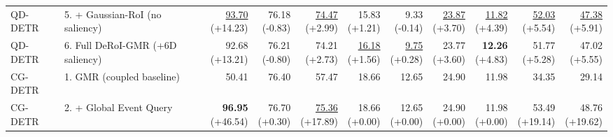 \documentclass{article}
\begin{document}
{\begin{tabular}{llrrrrrrrrr}
QD-DETR & 5. + Gaussian-RoI (no saliency) & \shortstack{\underline{93.70} \\ {\scriptsize (+14.23)}} & \shortstack{76.18 \\ {\scriptsize (-0.83)}} & \shortstack{\underline{74.47} \\ {\scriptsize (+2.99)}} & \shortstack{15.83 \\ {\scriptsize (+1.21)}} & \shortstack{9.33 \\ {\scriptsize (-0.14)}} & \shortstack{\underline{23.87} \\ {\scriptsize (+3.70)}} & \shortstack{\underline{11.82} \\ {\scriptsize (+4.39)}} & \shortstack{\underline{52.03} \\ {\scriptsize (+5.54)}} & \shortstack{\underline{47.38} \\ {\scriptsize (+5.91)}} \\
QD-DETR & 6. Full DeRoI-GMR (+6D saliency) & \shortstack{92.68 \\ {\scriptsize (+13.21)}} & \shortstack{76.21 \\ {\scriptsize (-0.80)}} & \shortstack{74.21 \\ {\scriptsize (+2.73)}} & \shortstack{\underline{16.18} \\ {\scriptsize (+1.56)}} & \shortstack{\underline{9.75} \\ {\scriptsize (+0.28)}} & \shortstack{23.77 \\ {\scriptsize (+3.60)}} & \shortstack{\textbf{12.26} \\ {\scriptsize (+4.83)}} & \shortstack{51.77 \\ {\scriptsize (+5.28)}} & \shortstack{47.02 \\ {\scriptsize (+5.55)}} \\
\midrule
CG-DETR & 1. GMR (coupled baseline) & 50.41 & 76.40 & 57.47 & 18.66 & 12.65 & 24.90 & 11.98 & 34.35 & 29.14 \\
CG-DETR & 2. + Global Event Query & \shortstack{\textbf{96.95} \\ {\scriptsize (+46.54)}} & \shortstack{76.70 \\ {\scriptsize (+0.30)}} & \shortstack{\underline{75.36} \\ {\scriptsize (+17.89)}} & \shortstack{18.66 \\ {\scriptsize (+0.00)}} & \shortstack{12.65 \\ {\scriptsize (+0.00)}} & \shortstack{24.90 \\ {\scriptsize (+0.00)}} & \shortstack{11.98 \\ {\scriptsize (+0.00)}} & \shortstack{53.49 \\ {\scriptsize (+19.14)}} & \shortstack{48.76 \\ {\scriptsize (+19.62)}} \\

\end{tabular}}
\end{document}

